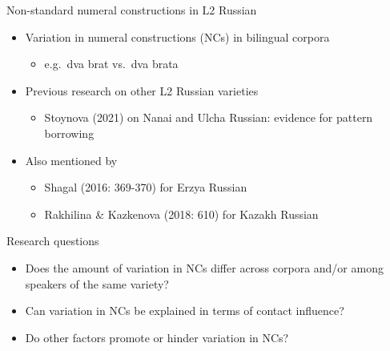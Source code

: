 \documentclass[
  ignorenonframetext,
  t]{beamer}
\providecommand{\tightlist}{%
  \setlength{\itemsep}{0pt}\setlength{\parskip}{0pt}}\usepackage{longtable,booktabs,array}
\begin{document}
\begin{frame}{Non-standard numeral constructions in L2 Russian}
\label{non-standard-numeral-constructions-in-l2-russian-1}
\begin{itemize}
\tightlist
\item
  Variation in numeral constructions (NCs) in bilingual corpora

  \begin{itemize}
  \tightlist
  \item
    e.g.~dva brat vs.~dva brata
  \end{itemize}
\item
  Previous research on other L2 Russian varieties

  \begin{itemize}
  \tightlist
  \item
    Stoynova (2021) on Nanai and Ulcha Russian: evidence for pattern
    borrowing
  \end{itemize}
\item
  Also mentioned by

  \begin{itemize}
  \tightlist
  \item
    Shagal (2016: 369-370) for Erzya Russian
  \item
    Rakhilina \& Kazkenova (2018: 610) for Kazakh Russian
  \end{itemize}
\end{itemize}
\end{frame}

\begin{frame}{Research questions}
\label{research-questions}
\begin{itemize}
\tightlist
\item
  Does the amount of variation in NCs differ across corpora and/or among
  speakers of the same variety?
\item
  Can variation in NCs be explained in terms of contact influence?
\item
  Do other factors promote or hinder variation in NCs?
\end{itemize}
\end{frame}
\end{document}
